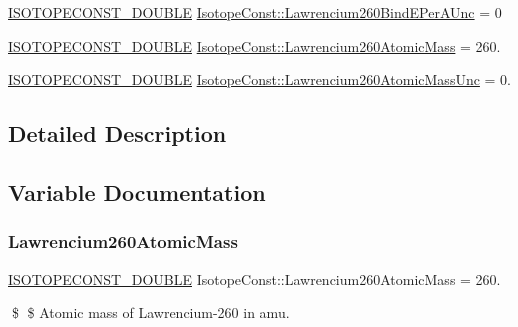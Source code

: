 \begin{DoxyCompactItemize}
\mbox{\hyperlink{group___isotope_const-_macros_ga8f45a7272ce02c0b4c65c44636ed719a}{I\+S\+O\+T\+O\+P\+E\+C\+O\+N\+S\+T\+\_\+\+D\+O\+U\+B\+LE}} \mbox{\hyperlink{group___isotope_const-_lawrencium-_lr260_gaa9060abb00557baebcc53ba77ca2b131}{Isotope\+Const\+::\+Lawrencium260\+Bind\+E\+Per\+A\+Unc}} = 0
\item 
\mbox{\hyperlink{group___isotope_const-_macros_ga8f45a7272ce02c0b4c65c44636ed719a}{I\+S\+O\+T\+O\+P\+E\+C\+O\+N\+S\+T\+\_\+\+D\+O\+U\+B\+LE}} \mbox{\hyperlink{group___isotope_const-_lawrencium-_lr260_ga53251abd20b1686a4d981c2c243ef725}{Isotope\+Const\+::\+Lawrencium260\+Atomic\+Mass}} = 260.
\item 
\mbox{\hyperlink{group___isotope_const-_macros_ga8f45a7272ce02c0b4c65c44636ed719a}{I\+S\+O\+T\+O\+P\+E\+C\+O\+N\+S\+T\+\_\+\+D\+O\+U\+B\+LE}} \mbox{\hyperlink{group___isotope_const-_lawrencium-_lr260_gacf0b8d25a2b1f9d401ab25ebaffea096}{Isotope\+Const\+::\+Lawrencium260\+Atomic\+Mass\+Unc}} = 0.
\end{DoxyCompactItemize}


\subsection{Detailed Description}


\subsection{Variable Documentation}
\mbox{\label{group___isotope_const-_lawrencium-_lr260_ga53251abd20b1686a4d981c2c243ef725}} 
\subsubsection{\texorpdfstring{Lawrencium260\+Atomic\+Mass}{Lawrencium260AtomicMass}}
{\footnotesize\ttfamily \mbox{\hyperlink{group___isotope_const-_macros_ga8f45a7272ce02c0b4c65c44636ed719a}{I\+S\+O\+T\+O\+P\+E\+C\+O\+N\+S\+T\+\_\+\+D\+O\+U\+B\+LE}} Isotope\+Const\+::\+Lawrencium260\+Atomic\+Mass = 260.}

\$ \$ Atomic mass of Lawrencium-\/260 in amu. \mbox{\label{group___isotope_const-_lawrencium-_lr260_gacf0b8d25a2b1f9d401ab25ebaffea096}} 
